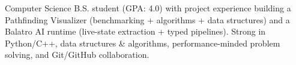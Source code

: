 

\begin{cvparagraph}

Computer Science B.S. student (GPA: 4.0) with project experience building a Pathfinding Visualizer (benchmarking + algorithms + data structures) and a Balatro AI runtime (live-state extraction + typed pipelines). Strong in Python/C++, data structures \& algorithms, performance-minded problem solving, and Git/GitHub collaboration.

\end{cvparagraph}

